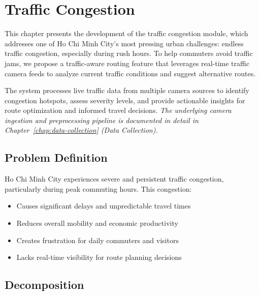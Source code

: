 \chapter{Traffic Congestion}
\label{chap:traffic-congestion}

This chapter presents the development of the traffic congestion module, which addresses one of Ho Chi Minh City's most pressing urban challenges: endless traffic congestion, especially during rush hours. To help commuters avoid traffic jams, we propose a traffic-aware routing feature that leverages real-time traffic camera feeds to analyze current traffic conditions and suggest alternative routes.

The system processes live traffic data from multiple camera sources to identify congestion hotspots, assess severity levels, and provide actionable insights for route optimization and informed travel decisions.
\newline\textit{The underlying camera ingestion and preprocessing pipeline is documented in detail in Chapter~\ref{chap:data-collection} (Data Collection).}



\section{Problem Definition}

Ho Chi Minh City experiences severe and persistent traffic congestion, particularly during peak commuting hours. This congestion:
\begin{itemize}
    \item Causes significant delays and unpredictable travel times
    \item Reduces overall mobility and economic productivity
    \item Creates frustration for daily commuters and visitors
    \item Lacks real-time visibility for route planning decisions
\end{itemize}

\section{Decomposition}

